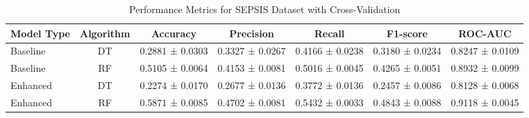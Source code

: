\begin{table}[ht]
\centering
\caption{Performance Metrics for SEPSIS Dataset with Cross-Validation}
\begin{tabular}{lcccccc}
\toprule
Model Type & Algorithm & Accuracy & Precision & Recall & F1-score & ROC-AUC \\
\midrule
Baseline & DT & 0.2881 ± 0.0303 & 0.3327 ± 0.0267 & 0.4166 ± 0.0238 & 0.3180 ± 0.0234 & 0.8247 ± 0.0109 \\
Baseline & RF & 0.5105 ± 0.0064 & 0.4153 ± 0.0081 & 0.5016 ± 0.0045 & 0.4265 ± 0.0051 & 0.8932 ± 0.0099 \\
Enhanced & DT & 0.2274 ± 0.0170 & 0.2677 ± 0.0136 & 0.3772 ± 0.0136 & 0.2457 ± 0.0086 & 0.8128 ± 0.0068 \\
Enhanced & RF & 0.5871 ± 0.0085 & 0.4702 ± 0.0081 & 0.5432 ± 0.0033 & 0.4843 ± 0.0088 & 0.9118 ± 0.0045 \\
\bottomrule
\end{tabular}
\label{tab:sepsis_cv_performance}
\end{table}
